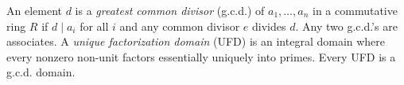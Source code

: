 An element $d$ is a \textit{greatest common divisor} (g.c.d.) of $a_1, \ldots, a_n$ in a commutative ring $R$ if $d \mid a_i$ for all $i$ and any common divisor $e$ divides $d$. Any two g.c.d.'s are associates. A \textit{unique factorization domain} (UFD) is an integral domain where every nonzero non-unit factors essentially uniquely into primes. Every UFD is a g.c.d. domain.
